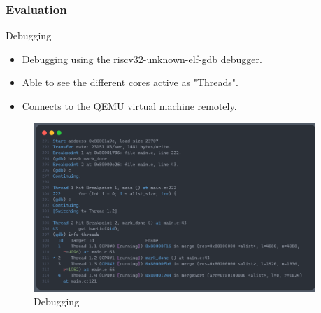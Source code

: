 \begin{frame}[hoved]
	\frametitle{Evaluation}
	\begin{minipage}[t]{0.45\textwidth}
		{\large Debugging}
		\begin{itemize}
			\item Debugging using the riscv32-unknown-elf-gdb debugger.
			\item Able to see the different cores active as "Threads".
			\item Connects to the QEMU virtual machine remotely.
		\end{itemize}
	\end{minipage}
	\hfill
	\begin{minipage}[t]{0.45\textwidth}
		\begin{figure}
			\begin{center}
				\includegraphics[width=0.95\textwidth]{figures/debugging.png}
			\end{center}
			\caption{Debugging}\label{fig:debugging}
		\end{figure}
	\end{minipage}
\end{frame}

